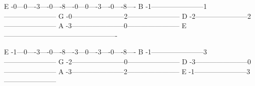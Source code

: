 
\bextra
{}
\eextra
\btab
E -0---0----3----0----8----0---0----3----0----8----
B -1-----------------------1-----------------------
G -0-----------------------2-----------------------
D -2-----------------------2-----------------------
A -3-----------------------0-----------------------
E -------------------------------------------------
\etab

\eject

\btab
E -1---0----3----0----8----3---0----3----0----8----
B -1-----------------------3-----------------------
G -2-----------------------0-----------------------
D -3-----------------------0-----------------------
A -3-----------------------2-----------------------
E -1-----------------------3-----------------------
\etab

\esong


\bye




